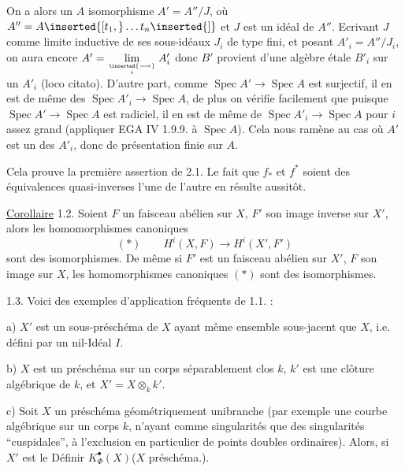 On a alors un $A$ isomorphisme $A'=A''/J$, où $A''=A\inserted{[t_1,}\ldots t_n\inserted{]}$ et $J$ est un idéal de $A''$. Ecrivant $J$ comme limite inductive de ses sous-idéaux $J_i$ de type fini, et posant $A'_i=A''/J_i$, on aura encore $A'=\mathop{\lim}\limits_{\inserted{\longrightarrow}\atop i}A'_i$ donc $B'$ provient d'une algèbre étale $B'_i$ sur un $A'_i$ (loco citato). D'autre part, comme $\operatorname{Spec}A'\to\operatorname{Spec}A$ est surjectif, il en est de même des $\operatorname{Spec}A'_i\to\operatorname{Spec}A$, de plus on vérifie facilement que puisque $\operatorname{Spec}A'\to\operatorname{Spec}A$ est radiciel, il en est de même de $\operatorname{Spec}A'_i\to\operatorname{Spec}A$ pour $i$ assez grand (appliquer EGA IV 1.9.9. à $\operatorname{Spec}A$). Cela nous ramène au cas où $A'$ est un des $A'_i$, donc de présentation finie sur $A$.

Cela prouve la première assertion de 2.1. Le fait que $f_*$ et $f^*$ soient des équivalences quasi-inverses l'une de l'autre en résulte aussitôt.

\uline{Corollaire} 1.2. Soient $F$ un faisceau abélien sur $X$, $F'$ son image inverse sur $X'$, alors les homomorphismes canoniques
\[
(*)\qquad H^i(X,F)\longrightarrow H^i(X',F')
\]
sont des isomorphismes. De même si $F'$ est un faisceau abélien sur $X'$, $F$ son image sur $X$, les homomorphismes canoniques $(*)$ sont des isomorphismes.

1.3. Voici des exemples d'application fréquents de 1.1. :


a) $X'$ est un sous-préschéma de $X$ ayant même ensemble sous-jacent que $X$, i.e. défini par un nil-Idéal $I$.

b) $X$ est un préschéma sur un corps séparablement clos $k$, $k'$ est une clôture algébrique de $k$, et $X'=X\otimes_k k'$.

 c) Soit $X$ un préschéma géométriquement unibranche (par exemple une courbe algébrique sur un corps $k$, n'ayant comme singularités que des singularités ``cuspidales'', à l'exclusion en particulier de points doubles ordinaires). Alors, si $X'$ est le 
Définir $K^\bullet_\Phi(X)$\quad ($X$ préschéma.).

